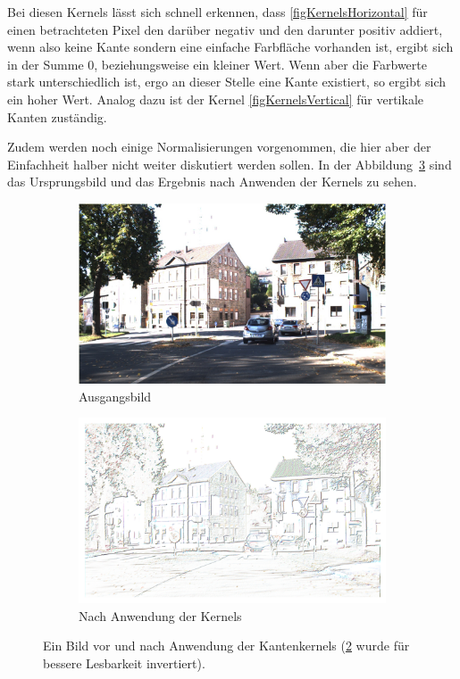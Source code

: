 \documentclass[runningheads]{llncs}
\begin{document}
Bei diesen Kernels lässt sich schnell erkennen, dass \ref{figKernelsHorizontal} für einen betrachteten Pixel den darüber negativ und den darunter positiv addiert, wenn also keine Kante sondern eine einfache Farbfläche vorhanden ist, ergibt sich in der Summe 0, beziehungsweise ein kleiner Wert. Wenn aber die Farbwerte stark unterschiedlich ist, ergo an dieser Stelle eine Kante existiert, so ergibt sich ein hoher Wert. Analog dazu ist der Kernel \ref{figKernelsVertical} für vertikale Kanten zuständig.

Zudem werden noch einige Normalisierungen vorgenommen, die hier aber der Einfachheit halber nicht weiter diskutiert werden sollen. In der Abbildung~\ref{fig3} sind das Ursprungsbild und das Ergebnis nach Anwenden der Kernels zu sehen.

\begin{figure}[H]
    \centering
    \begin{subfigure}{0.49\textwidth}
        \centering
        \includegraphics[width=\linewidth]{images/00001.jpg}
        \caption{Ausgangsbild}
        \label{fig3original}
    \end{subfigure}
    \hfill
    \begin{subfigure}{0.49\textwidth}
        \centering
        \includegraphics[width=\linewidth]{images/edges_inverted.png}
        \caption{Nach Anwendung der Kernels}
        \label{fig3edges}
    \end{subfigure}
    \caption{Ein Bild vor und nach Anwendung der Kantenkernels (\ref{fig3edges} wurde für bessere Lesbarkeit invertiert).}
    \label{fig3}
\end{figure}
\end{document}

